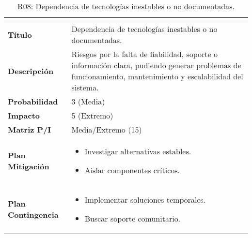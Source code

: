 \begin{table}[H]
\centering
\begin{tabular}{|>{\bfseries}l|p{10cm}|}
\hline
\rowcolor{lightgray}
\multicolumn{2}{|c|}{\textbf{Riesgo R08}} \\ \hline
Título & Dependencia de tecnologías inestables o no documentadas.  \\ \hline
Descripción & Riesgos por la falta de fiabilidad, soporte o información clara, pudiendo generar problemas de funcionamiento, mantenimiento y escalabilidad del sistema. \\ \hline
Probabilidad & 3 (Media) \\ \hline
Impacto & 5 (Extremo) \\ \hline
Matriz P/I & Media/Extremo (15) \\ \hline
Plan Mitigación & 
\begin{itemize}
\item Investigar alternativas estables.
\item Aislar componentes críticos.
\end{itemize} \\ \hline
Plan Contingencia & 
\begin{itemize}
\item Implementar soluciones temporales.
\item Buscar soporte comunitario.
\end{itemize} \\ \hline
\end{tabular}
\caption{R08: Dependencia de tecnologías inestables o no documentadas. }
\label{tab:R08}
\end{table}

